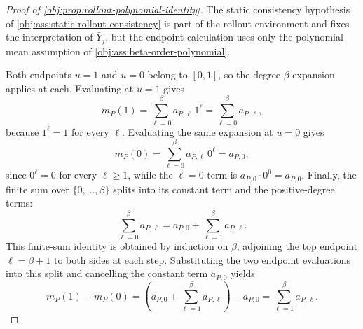 \documentclass[11pt]{article}
\begin{document}
\begin{proof}[Proof of \cref{obj:prop:rollout-polynomial-identity}]
The static consistency hypothesis of \cref{obj:ass:static-rollout-consistency} is part of the rollout environment and fixes the interpretation of \(\bar Y_j\), but the endpoint calculation uses only the polynomial mean assumption of \cref{obj:ass:beta-order-polynomial}.

Both endpoints \(u=1\) and \(u=0\) belong to \([0,1]\), so the degree-\(\beta\) expansion applies at each. Evaluating at \(u=1\) gives
\[
m_P(1)=\sum_{\ell=0}^{\beta}a_{P,\ell}\,1^\ell=\sum_{\ell=0}^{\beta}a_{P,\ell},
\]
because \(1^\ell=1\) for every \(\ell\). %
Evaluating the same expansion at \(u=0\) gives
\[
m_P(0)=\sum_{\ell=0}^{\beta}a_{P,\ell}\,0^\ell=a_{P,0},
\]
since \(0^\ell=0\) for every \(\ell\ge1\), while the \(\ell=0\) term is \(a_{P,0}\cdot 0^0=a_{P,0}\). %
Finally, the finite sum over \(\{0,\ldots,\beta\}\) splits into its constant term and the positive-degree terms:
\[
\sum_{\ell=0}^{\beta}a_{P,\ell}
=
a_{P,0}+\sum_{\ell=1}^{\beta}a_{P,\ell}.
\]
This finite-sum identity is obtained by induction on \(\beta\), adjoining the top endpoint \(\ell=\beta+1\) to both sides at each step. %
Substituting the two endpoint evaluations into this split and cancelling the constant term \(a_{P,0}\) yields
\[
m_P(1)-m_P(0)
=
\left(a_{P,0}+\sum_{\ell=1}^{\beta}a_{P,\ell}\right)-a_{P,0}
=
\sum_{\ell=1}^{\beta}a_{P,\ell}.
\] %
\end{proof}
\end{document}
